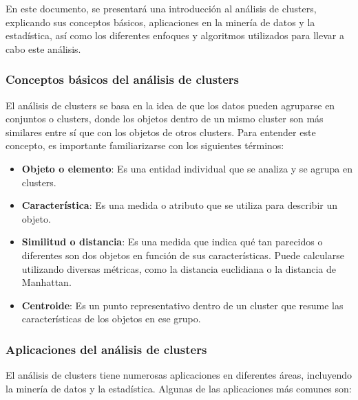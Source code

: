 \documentclass{article}
\begin{document}
En este documento, se presentará una introducción al análisis de clusters, explicando sus conceptos básicos, aplicaciones en la minería de datos y la estadística, así como los diferentes enfoques y algoritmos utilizados para llevar a cabo este análisis.
\subsubsection{Conceptos básicos del análisis de clusters}
El análisis de clusters se basa en la idea de que los datos pueden agruparse en conjuntos o clusters, donde los objetos dentro de un mismo cluster son más similares entre sí que con los objetos de otros clusters. Para entender este concepto, es importante familiarizarse con los siguientes términos:

\begin{itemize}
  \item \textbf{Objeto o elemento}: Es una entidad individual que se analiza y se agrupa en clusters.
  \item \textbf{Característica}: Es una medida o atributo que se utiliza para describir un objeto.
  \item \textbf{Similitud o distancia}: Es una medida que indica qué tan parecidos o diferentes son dos objetos en función de sus características. Puede calcularse utilizando diversas métricas, como la distancia euclidiana o la distancia de Manhattan.
  \item \textbf{Centroide}: Es un punto representativo dentro de un cluster que resume las características de los objetos en ese grupo.
\end{itemize}
\subsubsection{Aplicaciones del análisis de clusters}
El análisis de clusters tiene numerosas aplicaciones en diferentes áreas, incluyendo la minería de datos y la estadística. Algunas de las aplicaciones más comunes son:
\end{document}
